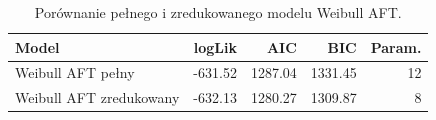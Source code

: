 \begin{table}[htbp]
\centering
\caption{Porównanie pełnego i zredukowanego modelu Weibull AFT.}
\label{tab:aft-full-red}
\small
\setlength{\tabcolsep}{2.4pt}
\begin{tabular*}{.98\linewidth}{@{\extracolsep{\fill}}lrrrr}
\toprule
Model & logLik & AIC & BIC & Param. \\
\midrule
Weibull AFT pełny & -631.52 & 1287.04 & 1331.45 & 12 \\
Weibull AFT zredukowany & -632.13 & 1280.27 & 1309.87 & 8 \\
\bottomrule
\end{tabular*}
\end{table}
